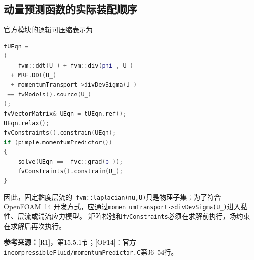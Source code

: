 \documentclass[UTF8,12pt,a4paper]{ctexart}
\numberwithin{equation}{section}
\newcommand{\Rone}{\textnormal{[R1]}}
\newcommand{\OFfourteen}{\textnormal{[OF14]}}
\newcommand{\source}[1]{\par\smallskip\noindent\colorbox{sourcebg}{%
  \parbox{0.955\linewidth}{\footnotesize\color{sourcegray}\textbf{参考来源：}#1}}\par\smallskip}
\begin{document}
\subsection{动量预测函数的实际装配顺序}
官方模块的逻辑可压缩表示为
\begin{lstlisting}[style=foam,language=C++]
tUEqn =
(
    fvm::ddt(U_) + fvm::div(phi_, U_)
  + MRF.DDt(U_)
  + momentumTransport->divDevSigma(U_)
 == fvModels().source(U_)
);
fvVectorMatrix& UEqn = tUEqn.ref();
UEqn.relax();
fvConstraints().constrain(UEqn);
if (pimple.momentumPredictor())
{
    solve(UEqn == -fvc::grad(p_));
    fvConstraints().constrain(U_);
}
\end{lstlisting}
因此，固定黏度层流的\texttt{-fvm::laplacian(nu,U)}只是物理子集；为了符合OpenFOAM~14
开发方式，应通过\texttt{momentumTransport->divDevSigma(U\_)}进入黏性、层流或湍流应力模型。
矩阵松弛和\texttt{fvConstraints}必须在求解前执行，场约束在求解后再次执行。
\source{\Rone，第15.5.1节；\OFfourteen：官方
\texttt{incompressibleFluid/momentumPredictor.C}第36--54行。}
\end{document}
